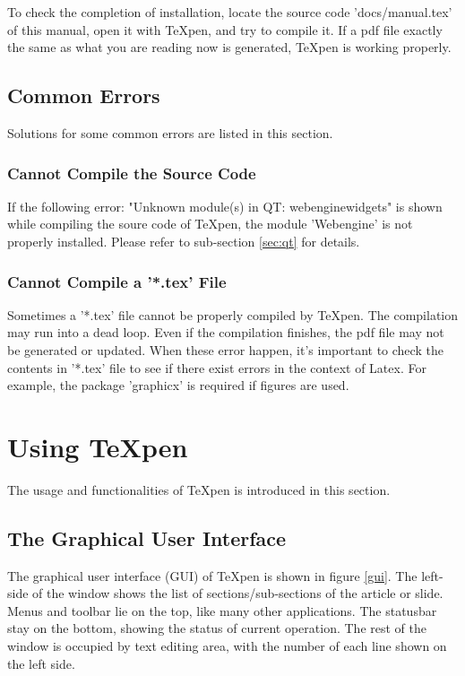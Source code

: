 \documentclass[12pt,a4paper]{article}
\begin{document}
To check the completion of installation, locate the source code 'docs/manual.tex' of this manual, open it with {\TeX}pen, and try to compile it. If a pdf file exactly the same as what you are reading now is generated, {\TeX}pen is working properly.

\subsection{Common Errors}
Solutions for some common errors are listed in this section.

\subsubsection{Cannot Compile the Source Code}
If the following error: "Unknown module(s) in QT: webenginewidgets" is shown while compiling the soure code of {\TeX}pen, the module 'Webengine' is not properly installed. Please refer to sub-section \ref{sec:qt} for details.

\subsubsection{Cannot Compile a '*.tex' File}
Sometimes a '*.tex' file cannot be properly compiled by {\TeX}pen. The compilation may run into a dead loop. Even if  the compilation finishes, the pdf file may not be generated or updated. When these error happen, it's important to check the contents in '*.tex' file to see if there exist errors in the context of Latex. For example, the package 'graphicx' is required if figures are used. 

\section{Using {\TeX}pen}
The usage and functionalities of {\TeX}pen is introduced in this section.

\subsection{The Graphical User Interface}

The graphical user interface (GUI) of {\TeX}pen is shown in figure \ref{gui}. The left-side of the window shows the list of sections/sub-sections of the article or slide. Menus and toolbar lie on the top, like many other applications. The statusbar stay on the bottom, showing the status of current operation. The rest of the window is occupied by text editing area, with the number of each line shown on the left side.
\end{document}
